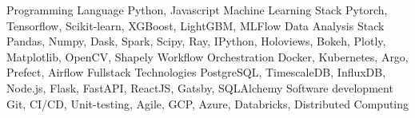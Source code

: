 \begin{cvskills}
  \cvskill
    {Programming Language}   
    {Python, Javascript}
  \cvskill
    {Machine Learning Stack}   
    {Pytorch, Tensorflow, Scikit-learn, XGBoost, LightGBM, MLFlow}
  \cvskill
    {Data Analysis Stack}   
    {Pandas, Numpy, Dask, Spark, Scipy, Ray, IPython, Holoviews, Bokeh, Plotly, Matplotlib, OpenCV, Shapely}
  \cvskill
    {Workflow Orchestration}
    {Docker, Kubernetes, Argo, Prefect, Airflow}
  \cvskill
    {Fullstack Technologies}   
    {PostgreSQL, TimescaleDB, InfluxDB, Node.js, Flask, FastAPI, ReactJS, Gatsby, SQLAlchemy}
  \cvskill
    {Software development} 
    {Git, CI/CD, Unit-testing, Agile, GCP, Azure, Databricks, Distributed Computing}
\end{cvskills}
